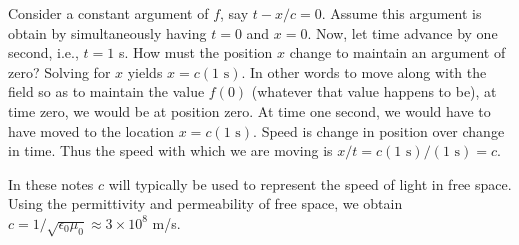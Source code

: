 Consider a constant argument of $f$, say $t - x/c=0$.  Assume this
argument is obtain by simultaneously having $t=0$ and $x=0$.  Now, let
time advance by one second, i.e., $t=1$ s.  How must the position $x$
change to maintain an argument of zero?  Solving for $x$ yields $x=c
(1 \mbox{\ s})$.  In other words to move along with the field so as to
maintain the value $f(0)$ (whatever that value happens to be), at time
zero, we would be at position zero.  At time one second, we would have
to have moved to the location $x=c (1 \mbox{\ s})$.  Speed is change
in position over change in time.  Thus the speed with which we are
moving is $x/t = c (1 \mbox{\ s})/(1 \mbox{\ s}) = c$.

In these notes $c$ will typically be used to represent the speed of
light in free space.  Using the permittivity and permeability of free
space, we obtain $c=1/\sqrt{\epsilon_0\mu_0}\approx 3 \times 10^8$ m/s.
